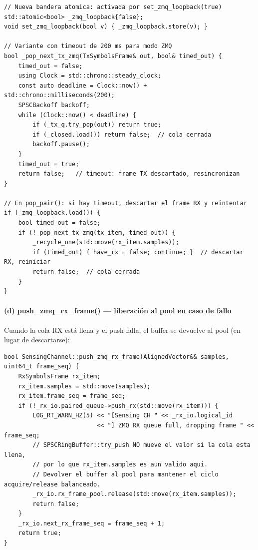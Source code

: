 \documentclass[11pt,a4paper]{article}
\begin{document}
\begin{lstlisting}[style=cpp,
  caption={Timeout ZMQ en PairedFrameQueue — SensingChannel.cpp, líneas 370--412}]
// Nueva bandera atomica: activada por set_zmq_loopback(true)
std::atomic<bool> _zmq_loopback{false};
void set_zmq_loopback(bool v) { _zmq_loopback.store(v); }

// Variante con timeout de 200 ms para modo ZMQ
bool _pop_next_tx_zmq(TxSymbolsFrame& out, bool& timed_out) {
    timed_out = false;
    using Clock = std::chrono::steady_clock;
    const auto deadline = Clock::now() + std::chrono::milliseconds(200);
    SPSCBackoff backoff;
    while (Clock::now() < deadline) {
        if (_tx_q.try_pop(out)) return true;
        if (_closed.load()) return false;  // cola cerrada
        backoff.pause();
    }
    timed_out = true;
    return false;   // timeout: frame TX descartado, resincronizan
}

// En pop_pair(): si hay timeout, descartar el frame RX y reintentar
if (_zmq_loopback.load()) {
    bool timed_out = false;
    if (!_pop_next_tx_zmq(tx_item, timed_out)) {
        _recycle_one(std::move(rx_item.samples));
        if (timed_out) { have_rx = false; continue; }  // descartar RX, reiniciar
        return false;  // cola cerrada
    }
}
\end{lstlisting}

\paragraph{(d) push\_zmq\_rx\_frame() — liberación al pool en caso de fallo}

Cuando la cola RX está llena y el push falla, el buffer se devuelve al pool
(en lugar de descartarse):

\begin{lstlisting}[style=cpp,
  caption={push\_zmq\_rx\_frame con liberación al pool — SensingChannel.cpp, líneas 905--916}]
bool SensingChannel::push_zmq_rx_frame(AlignedVector&& samples, uint64_t frame_seq) {
    RxSymbolsFrame rx_item;
    rx_item.samples = std::move(samples);
    rx_item.frame_seq = frame_seq;
    if (!_rx_io.paired_queue->push_rx(std::move(rx_item))) {
        LOG_RT_WARN_HZ(5) << "[Sensing CH " << _rx_io.logical_id
                          << "] ZMQ RX queue full, dropping frame " << frame_seq;
        // SPSCRingBuffer::try_push NO mueve el valor si la cola esta llena,
        // por lo que rx_item.samples es aun valido aqui.
        // Devolver el buffer al pool para mantener el ciclo acquire/release balanceado.
        _rx_io.rx_frame_pool.release(std::move(rx_item.samples));
        return false;
    }
    _rx_io.next_rx_frame_seq = frame_seq + 1;
    return true;
}
\end{lstlisting}
\end{document}
